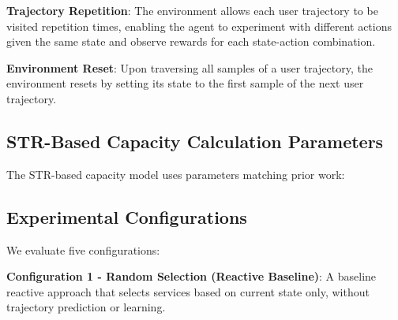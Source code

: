 \documentclass[10pt,twocolumn]{article}
\begin{document}
\textbf{Trajectory Repetition}: The environment allows each user
trajectory to be visited repetition times, enabling the agent to
experiment with different actions given the same state and observe
rewards for each state-action combination.

\textbf{Environment Reset}: Upon traversing all samples of a user
trajectory, the environment resets by setting its state to the first
sample of the next user trajectory.

\subsection{STR-Based Capacity Calculation Parameters}\label{str-based-capacity-calculation-parameters}

The STR-based capacity model uses parameters matching prior work:

\begin{table}[t]
	\centering
	\caption{STR-Based Capacity Calculation Parameters}
	\label{str-params-table}
\end{table}

\subsection{Experimental Configurations}\label{experimental-configurations}

We evaluate five configurations:

\textbf{Configuration 1 - Random Selection (Reactive Baseline)}: A
baseline reactive approach that selects services based on current state
only, without trajectory prediction or learning.
\end{document}
